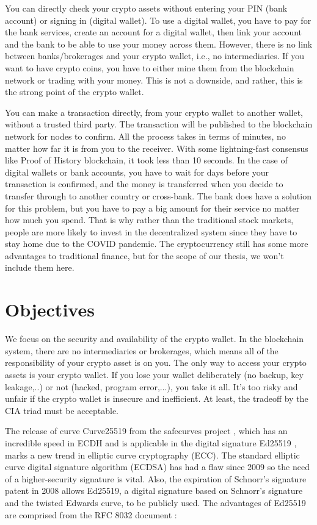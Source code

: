 You can directly check your crypto assets without entering your PIN (bank account) or signing in (digital wallet). To use a digital wallet, you have to pay for the bank services, create an account for a digital wallet, then link your account and the bank to be able to use your money across them. However, there is no link between banks/brokerages and your crypto wallet, i.e., no intermediaries. If you want to have crypto coins, you have to either mine them from the blockchain network or trading with your money. This is not a downside, and rather, this is the strong point of the crypto wallet.

You can make a transaction directly, from your crypto wallet to another wallet, without a trusted third party. The transaction will be published to the blockchain network for nodes to confirm. All the process takes in terms of minutes, no matter how far it is from you to the receiver. With some lightning-fast consensus like Proof of History blockchain, it took less than 10 seconds. In the case of digital wallets or bank accounts, you have to wait for days before your transaction is confirmed, and the money is transferred when you decide to transfer through to another country or cross-bank. The bank does have a solution for this problem, but you have to pay a big amount for their service no matter how much you spend. That is why rather than the traditional stock markets, people are more likely to invest in the decentralized system since they have to stay home due to the COVID pandemic. The cryptocurrency still has some more advantages to traditional finance, but for the scope of our thesis, we won’t include them here.

\section{Objectives}
\label{objectives}

We focus on the security and availability of the crypto wallet. In the blockchain system, there are no intermediaries or brokerages, which means all of the responsibility of your crypto asset is on you. The only way to access your crypto assets is your crypto wallet. If you lose your wallet deliberately (no backup, key leakage,..) or not (hacked, program error,...), you take it all. It’s too risky and unfair if the crypto wallet is insecure and inefficient. At least, the tradeoff by the CIA triad must be acceptable.

The release of curve Curve25519 from the safecurves project \cite{Bernstein2006}, which has an incredible speed in ECDH and is applicable in the digital signature Ed25519 \cite{Bernstein2011}, marks a new trend in elliptic curve cryptography (ECC). The standard elliptic curve digital signature algorithm (ECDSA) has had a flaw since 2009 \cite{Schmidt2009} so the need of a higher-security signature is vital. Also, the expiration of Schnorr’s signature patent in 2008 allows Ed25519, a digital signature based on Schnorr’s signature and the twisted Edwards curve, to be publicly used. The advantages of Ed25519 are comprised from the RFC 8032 document \cite{Josefsson2017}:

